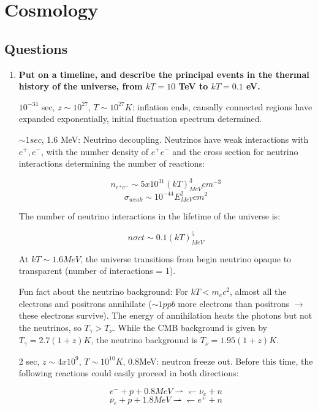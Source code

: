 \section{Cosmology}
\subsection{Questions}
\begin{enumerate}
\item \textbf{Put on a timeline, and describe the principal events in the thermal history of the
universe, from $kT = 10$ TeV to $kT = 0.1$ eV.}

$10^{-34}$ sec, $z \sim 10^{27}$, $T \sim 10^{27}K$:  inflation ends, causally connected regions have expanded exponentially, initial fluctuation spectrum determined.

$\sim 1 sec$, 1.6 MeV:  Neutrino decoupling.  Neutrinos have weak interactions with $e^+, e^-$, with the number density of $e^+ e^-$ and the cross section for neutrino interactions determining the number of reactions:

\begin{equation}
n_{e^+e^-} \sim 5x10^{31}(kT)^3_{MeV} cm^{-3}
\end{equation}
\begin{equation}
\sigma_{weak} \sim 10^{-44}E_{MeV}^2 cm^2
\end{equation}

The number of neutrino interactions in the lifetime of the universe is:

\begin{equation}
n\sigma ct \sim 0.1(kT)^5_{MeV}
\end{equation}

At $kT \sim 1.6 MeV$, the universe transitions from begin neutrino opaque to transparent (number of interactions = 1).

Fun fact about the neutrino background:  For $kT < m_ec^2$, almost all the electrons and positrons annihilate ($\sim 1ppb$ more electrons than positrons $\rightarrow$ these electrons survive).  The energy of annihilation heats the photons but not the neutrinos, so $T_\gamma > T_\nu$.  While the CMB background is given by $T_\gamma = 2.7(1+z) K$, the neutrino background is $T_\nu = 1.95(1+z) K$.  

2 sec, $z \sim 4x10^9$, $T \sim 10^{10} K$, 0.8MeV:  neutron freeze out.  Before this time, the following reactions could easily proceed in both directions:

\begin{equation}
e^- + p + 0.8MeV \rightharpoonup \leftharpoondown \nu_e + n
\end{equation}
\begin{equation}
\bar \nu_e + p + 1.8MeV \rightharpoonup \leftharpoondown e^+ + n
\end{equation}


\end{enumerate}
